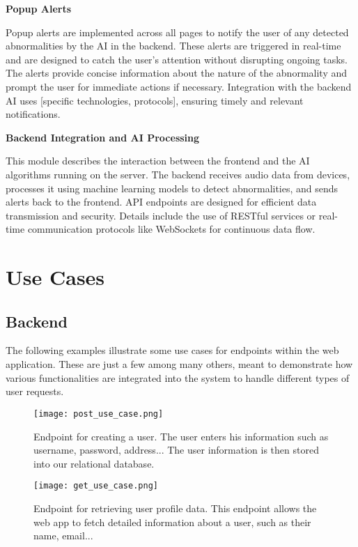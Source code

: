 \documentclass[conference]{IEEEtran}
\begin{document}
\textbf{Popup Alerts}

Popup alerts are implemented across all pages to notify the user of any detected abnormalities by the AI in the backend. These alerts are triggered in real-time and are designed to catch the user’s attention without disrupting ongoing tasks. The alerts provide concise information about the nature of the abnormality and prompt the user for immediate actions if necessary. Integration with the backend AI uses [specific technologies, protocols], ensuring timely and relevant notifications.
\vspace{0.5cm}

\textbf{Backend Integration and AI Processing}

This module describes the interaction between the frontend and the AI algorithms running on the server. The backend receives audio data from devices, processes it using machine learning models to detect abnormalities, and sends alerts back to the frontend. API endpoints are designed for efficient data transmission and security. Details include the use of RESTful services or real-time communication protocols like WebSockets for continuous data flow.

\section{Use Cases}

\subsection{Backend}

The following examples illustrate some use cases for endpoints within the web application. These are just a few among many others, meant to demonstrate how various functionalities are integrated into the system to handle different types of user requests.

\begin{figure}[H]
    \centering
    \texttt{[image: post\_use\_case.png]}
    \caption{Endpoint for creating a user. The user enters his information such as username, password, address... The user information is then stored into our relational database.}
\end{figure}


\begin{figure}[H]
    \centering
    \texttt{[image: get\_use\_case.png]}
    \caption{ Endpoint for retrieving user profile data. This endpoint allows the web app to fetch detailed information about a user, such as their name, email...}
\end{figure}
\end{document}
